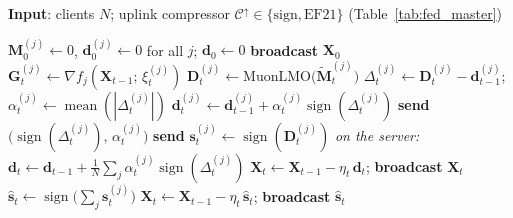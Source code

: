 \begin{algorithm}[H]
\algnarrow
    \caption{Federated SignMuon / EF21-SignMuon (worker-side LMO)}
    \label{alg:fed_workerlmo}
    \textbf{Input}: clients $N$; uplink compressor $\mathcal{C}^{\uparrow}\in\{\text{sign},\text{EF21}\}$ (Table~\ref{tab:fed_master})
    \begin{algorithmic}[1]
    \State $\mathbf{M}_0^{(j)} \gets 0$, $\mathbf{d}_0^{(j)} \gets 0$ for all $j$; \quad $\mathbf{d}_0 \gets 0$
    \State \textbf{broadcast} $\mathbf{X}_0$
            \State $\mathbf{G}_t^{(j)} \gets \nabla f_j(\mathbf{X}_{t-1};\,\xi_{t}^{(j)})$
            \State {}
            \State $\mathbf{D}_t^{(j)} \gets \mathrm{MuonLMO}\bigl(\tilde{\mathbf{M}}_t^{(j)}\bigr)$
                \State $\Delta_t^{(j)} \gets \mathbf{D}_t^{(j)} - \mathbf{d}_{t-1}^{(j)}$;\quad $\alpha_t^{(j)} \gets \operatorname{mean}(|\Delta_t^{(j)}|)$
                \State $\mathbf{d}_{t}^{(j)} \gets \mathbf{d}_{t-1}^{(j)} + \alpha_t^{(j)}\operatorname{sign}(\Delta_t^{(j)})$
                \State \textbf{send} $\bigl(\operatorname{sign}(\Delta_t^{(j)}),\, \alpha_t^{(j)}\bigr)$
            \Else
                \State \textbf{send} $\mathbf{s}_t^{(j)} \gets \operatorname{sign}(\mathbf{D}_t^{(j)})$
            \EndIf
        \EndFor
        \Statex \quad\emph{on the server:}
            \State $\mathbf{d}_t \gets \mathbf{d}_{t-1} + \tfrac{1}{N}\sum_{j} \alpha_t^{(j)}\operatorname{sign}(\Delta_t^{(j)})$
            \State $\mathbf{X}_{t} \gets \mathbf{X}_{t-1} - \eta_t\,\mathbf{d}_t$;\; \textbf{broadcast} $\mathbf{X}_t$
        \Else
            \State $\hat{\mathbf{s}}_t \gets \operatorname{sign}\bigl(\sum_{j} \mathbf{s}_t^{(j)}\bigr)$
            \State $\mathbf{X}_{t} \gets \mathbf{X}_{t-1} - \eta_t\,\hat{\mathbf{s}}_t$;\; \textbf{broadcast} $\hat{\mathbf{s}}_t$
        \EndIf
    \EndFor
    \end{algorithmic}
\end{algorithm}

